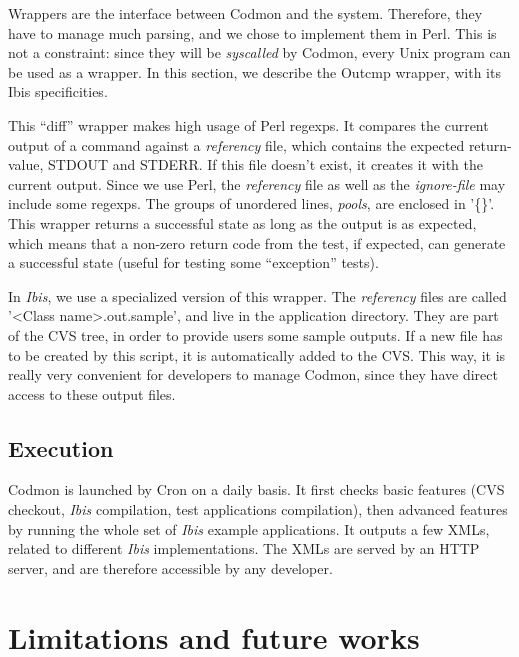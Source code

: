 \documentclass[a4paper,10pt]{article}
\renewcommand{\|}{\url|}
\begin{document}
Wrappers are the interface between Codmon and the system. Therefore, they have to manage much parsing, and we chose to implement them in Perl. This is not a constraint: since they will be \emph{syscalled} by Codmon, every Unix program can be used as a wrapper. In this section, we describe the Outcmp wrapper, with its Ibis specificities.

This ``diff'' wrapper makes high usage of Perl regexps. It compares the current output of a command against a \emph{referency} file, which contains the expected return-value, STDOUT and STDERR. If this file doesn't exist, it creates it with the current output. Since we use Perl, the \emph{referency} file as well as the \emph{ignore-file} may include some regexps. The groups of unordered lines, \emph{pools}, are enclosed in '\{\}'. This wrapper returns a successful state as long as the output is as expected, which means that a non-zero return code from the test, if expected, can generate a successful state (useful for testing some ``exception'' tests).

In \emph{Ibis}, we use a specialized version of this wrapper. The \emph{referency} files are called '<Class name>.out.sample', and live in the application directory. They are part of the CVS tree, in order to provide users some sample outputs. If a new file has to be created by this script, it is automatically added to the CVS. This way, it is really very convenient for developers to manage Codmon, since they have direct access to these output files.

\subsection{Execution}

Codmon is launched by Cron on a daily basis. It first checks basic features (CVS checkout, \emph{Ibis} compilation, test applications compilation), then advanced features by running the whole set of \emph{Ibis} example applications. It outputs a few XMLs, related to different \emph{Ibis} implementations. The XMLs are served by an HTTP server, and are therefore accessible by any developer.



\section{Limitations and future works}
\end{document}
